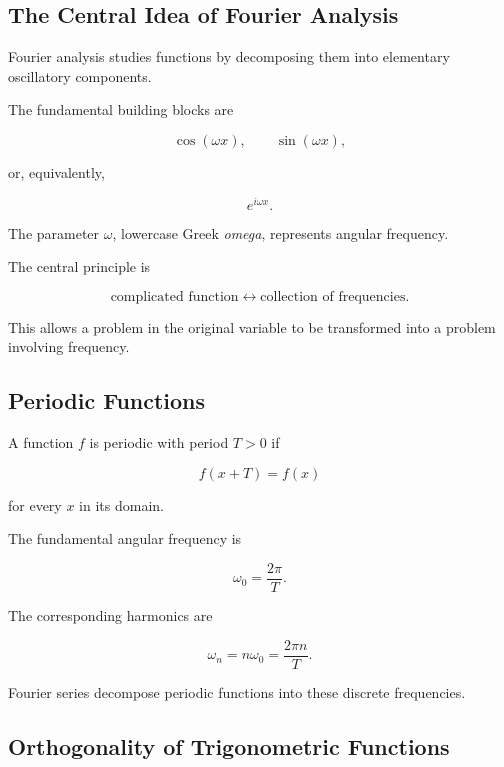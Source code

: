 \subsection{The Central Idea of Fourier Analysis}
\label{subsec:central-idea-fourier}

Fourier analysis studies functions by decomposing them into elementary
oscillatory components.

The fundamental building blocks are

\[
\boxed{
\cos(\omega x),
\qquad
\sin(\omega x),
}
\]

or, equivalently,

\[
\boxed{
e^{i\omega x}.
}
\]

The parameter \(\omega\), lowercase Greek \emph{omega}, represents angular
frequency.

The central principle is

\[
\boxed{
\text{complicated function}
\longleftrightarrow
\text{collection of frequencies}.
}
\]

This allows a problem in the original variable to be transformed into a
problem involving frequency.

\subsection{Periodic Functions}
\label{subsec:periodic-functions-fourier}

A function \(f\) is periodic with period \(T>0\) if

\[
\boxed{
f(x+T)=f(x)
}
\]

for every \(x\) in its domain.

The fundamental angular frequency is

\[
\boxed{
\omega_0=\frac{2\pi}{T}.
}
\]

The corresponding harmonics are

\[
\boxed{
\omega_n=n\omega_0
=
\frac{2\pi n}{T}.
}
\]

Fourier series decompose periodic functions into these discrete
frequencies.

\subsection{Orthogonality of Trigonometric Functions}
\label{subsec:trigonometric-orthogonality}

